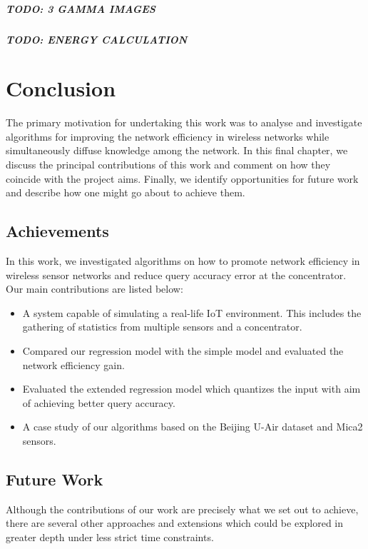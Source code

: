 \documentclass{mproj}
\begin{document}
\paragraph{TODO: 3 GAMMA IMAGES}

\paragraph{TODO: ENERGY CALCULATION}

\chapter{Conclusion}
The primary motivation for undertaking this work was to analyse and investigate algorithms for improving the network efficiency in wireless networks while simultaneously diffuse knowledge among the network. In this final chapter, we discuss the principal contributions of this work and comment on how they coincide with the project aims. Finally, we identify opportunities for future work and describe how one might go about to achieve them.

\section{Achievements}
In this work, we investigated algorithms on how to promote network efficiency in wireless sensor networks and reduce query accuracy error at the concentrator. Our main contributions are listed below:
\begin{itemize}
\item A system capable of simulating a real-life IoT environment. This includes the gathering of statistics from multiple sensors and a concentrator.
\item Compared our regression model with the simple model and evaluated the network efficiency gain.
\item Evaluated the extended regression model which quantizes the input with aim of achieving better query accuracy.
\item A case study of our algorithms based on the Beijing U-Air dataset\cite{air-quality-inference-meets-big-data} and Mica2\cite{adaptiveDataForwarding} sensors.
\end{itemize}

\section{Future Work}
Although the contributions of our work are precisely what we set out to achieve, there are several other approaches and extensions which could be explored in greater depth under less strict time constraints.
\end{document}
